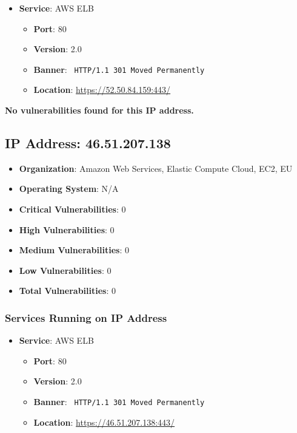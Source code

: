 \documentclass{article}
\begin{document}
\begin{itemize}
    
        \item \textbf{Service}: AWS ELB
        \begin{itemize}
            \item \textbf{Port}: 80
            \item \textbf{Version}:  2.0 
            \item \textbf{Banner}: \texttt{ HTTP/1.1 301 Moved Permanently
 }
            \item \textbf{Location}: \href{ https://52.50.84.159:443/ }{ https://52.50.84.159:443/ }
        \end{itemize}
    
\end{itemize}


\textbf{No vulnerabilities found for this IP address.}


\clearpage



\subsection*{IP Address: 46.51.207.138}

\begin{itemize}
    \item \textbf{Organization}: Amazon Web Services, Elastic Compute Cloud, EC2, EU
    \item \textbf{Operating System}:  N/A 
    \item \textbf{Critical Vulnerabilities}: 0
    \item \textbf{High Vulnerabilities}: 0
    \item \textbf{Medium Vulnerabilities}: 0
    \item \textbf{Low Vulnerabilities}: 0
    \item \textbf{Total Vulnerabilities}: 0
\end{itemize}

\subsubsection*{Services Running on IP Address}

\begin{itemize}
    
        \item \textbf{Service}: AWS ELB
        \begin{itemize}
            \item \textbf{Port}: 80
            \item \textbf{Version}:  2.0 
            \item \textbf{Banner}: \texttt{ HTTP/1.1 301 Moved Permanently
 }
            \item \textbf{Location}: \href{ https://46.51.207.138:443/ }{ https://46.51.207.138:443/ }
        \end{itemize}
    
\end{itemize}
\end{document}
